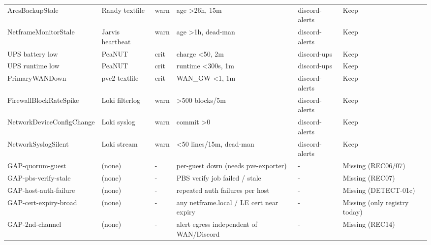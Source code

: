 {\begin{longtable}{p{3.1cm}p{2.1cm}p{1.4cm}p{3.1cm}p{1.7cm}p{2.4cm}}
AresBackupStale & Randy textfile & warn & age \textgreater 26h, 15m & discord-alerts & Keep \\
NetframeMonitorStale & Jarvis heartbeat & warn & age \textgreater 1h, dead-man & discord-alerts & Keep \\
UPS battery low & PeaNUT & crit & charge \textless 50, 2m & discord-ups & Keep \\
UPS runtime low & PeaNUT & crit & runtime \textless 300s, 1m & discord-ups & Keep \\
PrimaryWANDown & pve2 textfile & crit & WAN\_GW \textless 1, 1m & discord-alerts & Keep \\
FirewallBlockRateSpike & Loki filterlog & warn & \textgreater 500 blocks/5m & discord-alerts & Keep \\
NetworkDeviceConfigChange & Loki syslog & warn & commit \textgreater 0 & discord-alerts & Keep \\
NetworkSyslogSilent & Loki stream & warn & \textless 50 lines/15m, dead-man & discord-alerts & Keep \\
\midrule
GAP-quorum-guest & (none) & - & per-guest down (needs pve-exporter) & - & Missing (REC06/07) \\
GAP-pbs-verify-stale & (none) & - & PBS verify job failed / stale & - & Missing (REC07) \\
GAP-host-auth-failure & (none) & - & repeated auth failures per host & - & Missing (DETECT-01c) \\
GAP-cert-expiry-broad & (none) & - & any netframe.local / LE cert near expiry & - & Missing (only registry today) \\
GAP-2nd-channel & (none) & - & alert egress independent of WAN/Discord & - & Missing (REC14) \\
\bottomrule
\end{longtable}}
